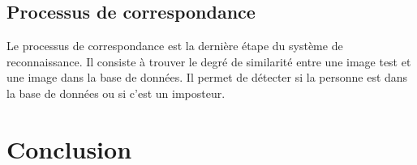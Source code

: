 \documentclass[12pt,twoside,letterpaper]{article}
\begin{document}
\subsection{Processus de correspondance}
Le processus de correspondance est la dernière étape du système de reconnaissance. Il consiste à trouver le degré de similarité entre une image test et une image dans la base de données. Il permet de détecter si la personne est dans la base de données ou si c’est un imposteur.\cite{ref_01}\cite{ref_06}

\section{Conclusion}

\newpage

\end{document}
